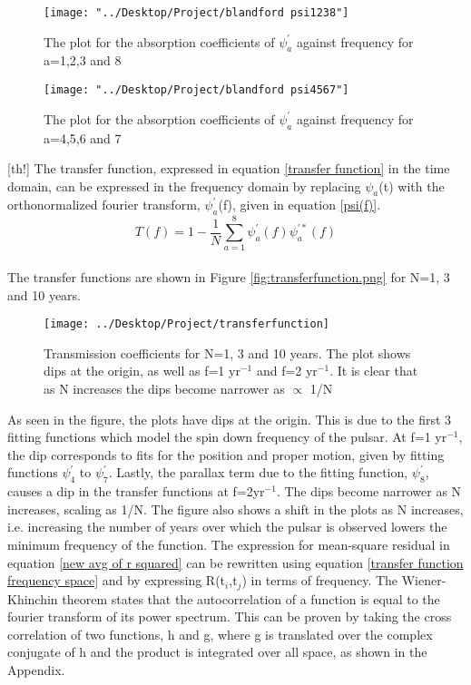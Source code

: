 \documentclass[12pt]{article}
\begin{document}
\begin{figure}[th!]
	\texttt{[image: "../Desktop/Project/blandford psi1238"]}
	\caption{\label{fig:blandford_psi1238.png} The plot for the absorption coefficients of $\psi_a^{'}$ against frequency for a=1,2,3 and 8}
	\label{fig:blandford-psi1238}
\end{figure}
\begin{figure}[th!]
	\texttt{[image: "../Desktop/Project/blandford psi4567"]}
	\caption{\label{fig:blandford_psi4567.png} The plot for the absorption coefficients of $\psi_a^{'}$ against frequency for a=4,5,6 and 7}
	\label{fig:blandford-psi4567}
\end{figure}[th!]
	The transfer function, expressed in equation \ref{transfer function} in the time domain, can be expressed in the frequency domain by replacing $\psi_a$(t) with the orthonormalized fourier transform, $\psi_a^{'}$(f), given in equation \ref{psi(f)}.\\
	\begin{equation}\label{transfer function frequency space}
	T(f)=1-\frac{1}{N}\sum_{a=1}^{8}\psi_a^{'}(f)\psi_a^{'*}(f)
	\end{equation}\\
	The transfer functions are shown in Figure \ref{fig:transferfunction.png} for N=1, 3 and 10 years. 
\begin{figure}[th!]
	\texttt{[image: ../Desktop/Project/transferfunction]}
	\caption{\label{fig:transferfunction}Transmission coefficients for N=1, 3 and 10 years. The plot shows dips at the origin, as well as f=1 yr$^{-1}$ and f=2 yr$^{-1}$. It is clear that as N increases the dips become narrower as $\propto$ 1/N}
\end{figure}
	As seen in the figure, the plots have dips at the origin. This is due to the first 3 fitting functions which model the spin down frequency of the pulsar. At f=1 yr$^{-1}$, the dip corresponds to fits for the position and proper motion, given by fitting functions $\psi_4^{'}$ to $\psi_7^{'}$. Lastly, the parallax term due to the fitting function, $\psi_8^{'}$, causes a dip in the transfer functions at f=2yr$^{-1}$. The dips become narrower as N increases, scaling as 1/N. The figure also shows a shift in the plots as N increases, i.e. increasing the number of years over which the pulsar is observed lowers the minimum frequency of the function.
	The expression for mean-square residual in equation \ref{new avg of r squared} can be rewritten using equation \ref{transfer function frequency space} and by expressing R(t$_i$,t$_j$) in terms of frequency. The Wiener-Khinchin theorem states that the autocorrelation of a function is equal to the fourier transform of its power spectrum. This can be proven by taking the cross correlation of two functions, h and g, where g is translated over the complex conjugate of h and the product is integrated over all space, as shown in the Appendix.\\ 
\end{document}
